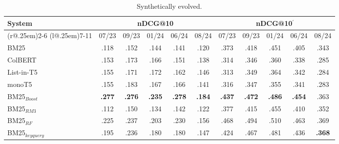 \begin{table}[t]
\small
\centering
\renewcommand{\tabcolsep}{3.2pt}
\caption{Synthetically evolved.}
\label{tab:table-results-fold}

\begin{tabular}{@{}l@{}cccccccccc@{}}
    \toprule
    \bfseries System & \multicolumn{5}{c}{\bfseries nDCG@10} & \multicolumn{5}{c}{\bfseries nDCG@10$^{'}$}\\
    \cmidrule(r@{.25em}){2-6}
    \cmidrule(l@{.25em}){7-11}
    
    & 07/23 & 09/23 & 01/24 & 06/24 & 08/24 & 07/23 & 09/23 & 01/24 & 06/24 & 08/24\\
    
    \midrule

    BM25 & .118 & .152 & .144 & .141 & .120 & .373 & .418 & .451 & .405 & .343 \\
    ColBERT & .153 & .173 & .166 & .151 & .138 & .314 & .346 & .360 & .338 & .285 \\
    List-in-T5 & .155 & .171 & .172 & .162 & .146 & .313 & .349 & .364 & .342 & .284 \\
    monoT5 & .155 & .183 & .167 & .166 & .141 & .316 & .347 & .355 & .341 & .283 \\
    
    \midrule
    
    BM25$_{Boost}$ & \bfseries .277 & \bfseries .276 & \bfseries .235 & \bfseries .278 & \bfseries .184 & \bfseries .437 & \bfseries .472 & \bfseries .486 & \bfseries .454 & .363 \\
    BM25$_{RM3}$ & .112 & .150 & .134 & .142 & .122 & .377 & .415 & .455 & .410 & .352 \\
    BM25$_{RF}$ & .225 & .237 & .203 & .230 & .156 & .468 & .494 & .510 & .463 & .369 \\
    BM25$_{keyquery}$ & .195 & .236 & .180 & .180 & .147 & .424 & .467 & .481 & .436 & \bfseries.368 \\

\bottomrule
\end{tabular}
\end{table}
